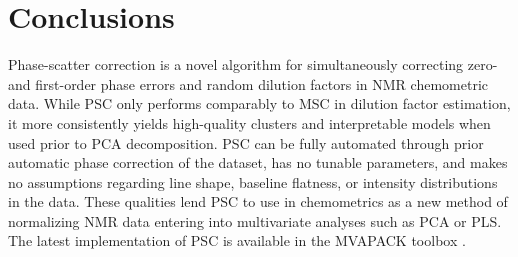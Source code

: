 \section{Conclusions}

\begin{doublespace}
Phase-scatter correction is a novel algorithm for simultaneously correcting
zero- and first-order phase errors and random dilution factors in \hnmr{}
NMR chemometric data. While PSC only performs comparably to MSC in dilution
factor estimation, it more consistently yields high-quality clusters and
interpretable models when used prior to PCA decomposition. PSC can be fully
automated through prior automatic phase correction of the dataset, has no
tunable parameters, and makes no assumptions regarding line shape, baseline
flatness, or intensity distributions in the data. These qualities lend PSC to
use in chemometrics as a new method of normalizing NMR data entering into
multivariate analyses such as PCA or PLS. The latest implementation of PSC
is available in the MVAPACK toolbox \cite{worley:acscb2014}.
\end{doublespace}




